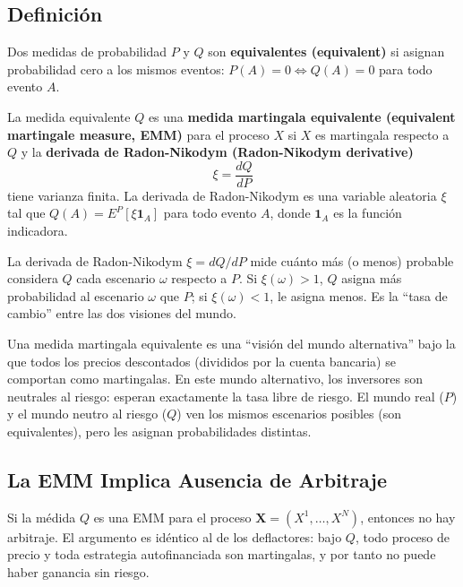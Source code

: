 \documentclass[12pt]{article}
\begin{document}
\subsection{Definici\'on}

Dos medidas de probabilidad $P$ y $Q$ son \textbf{equivalentes (equivalent)} si asignan probabilidad cero a los mismos eventos: $P(A) = 0 \Leftrightarrow Q(A) = 0$ para todo evento $A$.

La medida equivalente $Q$ es una \textbf{medida martingala equivalente (equivalent martingale measure, EMM)} para el proceso $X$ si $X$ es martingala respecto a $Q$ y la \textbf{derivada de Radon-Nikodym (Radon-Nikodym derivative)}
\begin{equation}
  \xi = \frac{dQ}{dP}
\end{equation}
tiene varianza finita. La derivada de Radon-Nikodym es una variable aleatoria $\xi$ tal que $Q(A) = E^P[\xi \mathbf{1}_A]$ para todo evento $A$, donde $\mathbf{1}_A$ es la funci\'on indicadora.

\begin{intuicionmat}
La derivada de Radon-Nikodym $\xi = dQ/dP$ mide cu\'anto m\'as (o menos) probable considera $Q$ cada escenario $\omega$ respecto a $P$. Si $\xi(\omega) > 1$, $Q$ asigna m\'as probabilidad al escenario $\omega$ que $P$; si $\xi(\omega) < 1$, le asigna menos. Es la ``tasa de cambio'' entre las dos visiones del mundo.
\end{intuicionmat}

\begin{intuicion}
Una medida martingala equivalente es una ``visi\'on del mundo alternativa'' bajo la que todos los precios descontados (divididos por la cuenta bancaria) se comportan como martingalas. En este mundo alternativo, los inversores son neutrales al riesgo: esperan exactamente la tasa libre de riesgo. El mundo real ($P$) y el mundo neutro al riesgo ($Q$) ven los mismos escenarios posibles (son equivalentes), pero les asignan probabilidades distintas.
\end{intuicion}

\subsection{La EMM Implica Ausencia de Arbitraje}

Si la m\'edida $Q$ es una EMM para el proceso $\mathbf{X} = (X^1, \ldots, X^N)$, entonces no hay arbitraje. El argumento es id\'entico al de los deflactores: bajo $Q$, todo proceso de precio y toda estrategia autofinanciada son martingalas, y por tanto no puede haber ganancia sin riesgo.
\end{document}
